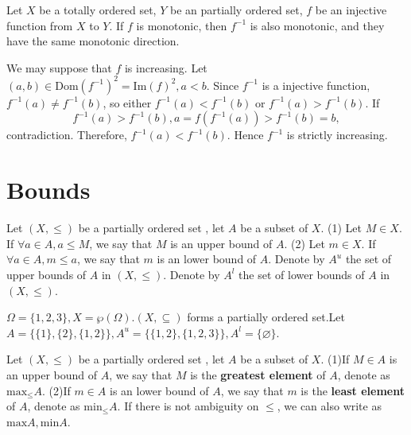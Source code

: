 \documentclass{book}
\numberwithin{equation}{section}
\begin{document}
\begin{propositionenv}
    Let $X$ be a totally ordered set,  $Y$ be an partially ordered set,  $f$ be an injective function from $X$ to $Y$. If $f$ is monotonic,  then $f^{-1}$ is also monotonic,  and they have the same monotonic direction.
\end{propositionenv}
\begin{proofenv}
    We may suppose that $f$ is increasing.
    Let $(a, b)\in \mathrm{Dom}(f^{-1})^2=\mathrm{Im}(f)^2, a<b$. Since $f^{-1}$ is a injective function,  $f^{-1}(a)\not =f^{-1}(b)$,  so either $f^{-1}(a)<f^{-1}(b)$ or $f^{-1}(a)>f^{-1}(b)$. If $$f^{-1}(a)>f^{-1}(b), a=f(f^{-1}(a))>f^{-1}(b)=b, $$ contradiction. Therefore,  $f^{-1}(a)<f^{-1}(b)$. Hence $f^{-1}$ is strictly increasing.
\end{proofenv}
\section{Bounds}
\begin{definitionenv}
    Let $(X, \le)$ be a partially ordered set , let $A$ be a subset of $X$.
    \newline
    (1) Let $M\in X$. If $\forall a \in A , a\le M$,  we say that $M$ is an upper bound of $A$. 
    \newline
    (2) Let $m\in X$. If $\forall a \in A , m\le a$,  we say that $m$ is an lower bound of $A$. 
    \newline
    Denote by $A^u$ the set of upper bounds of $A$ in $(X, \le)$.
    \newline
     Denote by $A^l$ the set of lower bounds of $A$ in $(X, \le)$.

\end{definitionenv}
\begin{exampleenv}
    $\Omega=\{1, 2, 3\}, X=\wp (\Omega).(X, \subseteq)$ forms a partially ordered set.Let $A=\{\{1\}, \{2\}, \{1, 2\}\}, A^u=\{\{1, 2\}, \{1, 2, 3\}\}, A^l=\{\varnothing\}$.
\end{exampleenv}
\begin{definitionenv}
    Let $(X, \le)$ be a partially ordered set , let $A$ be a subset of $X$.
    \newline
    (1)If $M \in A$ is an upper bound of $A$,  we say that $M$ is the \textbf{greatest element} of $A$,  denote as $\mathrm{max}_\le A$.
    \newline
    (2)If $m \in A$ is an lower bound of $A$,  we say that $m$ is the \textbf{least element} of $A$,  denote as $\mathrm{min}_\le A$.
    \newline
    If there is not ambiguity on $\le$, we can also write as $\mathrm{max}A, \mathrm{min}A$.
\end{definitionenv}
\end{document}
